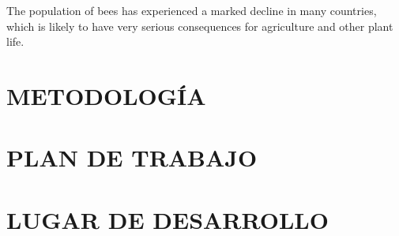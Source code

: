 \documentclass[12pt]{report}
\begin{document}
	The population of bees has experienced a marked decline in many countries, which is likely to have very serious consequences for agriculture and other plant life.
	
	
	
	
	\chapter{METODOLOGÍA}
	
	
	
	\chapter{PLAN DE TRABAJO}
	
	
	
	
	\chapter{LUGAR DE DESARROLLO}
	
	
	
	\pagebreak
	\printbibliography
	\thispagestyle{empty}
	
\end{document}
